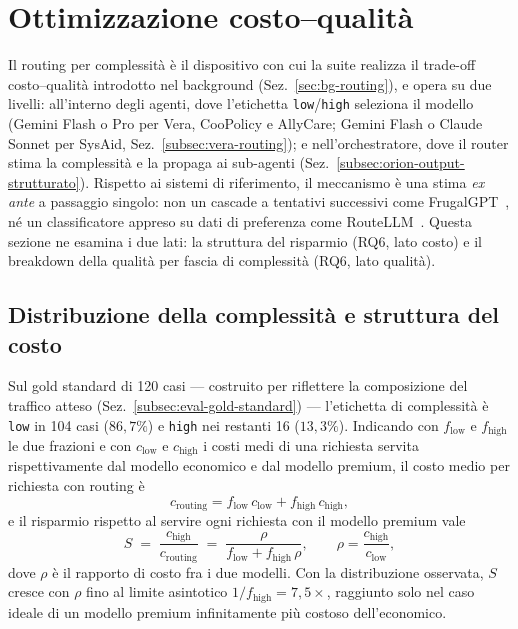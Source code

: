 \section{Ottimizzazione costo--qualità}
\label{sec:eval-costo-qualita}

Il routing per complessità è il dispositivo con cui la suite realizza il
trade-off costo--qualità introdotto nel background
(Sez.~\ref{sec:bg-routing}), e opera su due livelli: all'interno degli
agenti, dove l'etichetta \texttt{low}/\texttt{high} seleziona il modello
(Gemini Flash o Pro per Vera, CooPolicy e AllyCare; Gemini Flash o Claude
Sonnet per SysAid, Sez.~\ref{subsec:vera-routing}); e nell'orchestratore,
dove il router stima la complessità e la propaga ai sub-agenti
(Sez.~\ref{subsec:orion-output-strutturato}). Rispetto ai sistemi di
riferimento, il meccanismo è una stima \emph{ex ante} a passaggio singolo:
non un cascade a tentativi successivi come
FrugalGPT~\cite{chen2023frugalgpt}, né un classificatore appreso su dati di
preferenza come RouteLLM~\cite{ong2024routellm}. Questa sezione ne esamina
i due lati: la struttura del risparmio (RQ6, lato costo) e il breakdown
della qualità per fascia di complessità (RQ6, lato qualità).

\subsection{Distribuzione della complessità e struttura del costo}
\label{subsec:eval-cq-costo}

Sul gold standard di 120 casi --- costruito per riflettere la composizione
del traffico atteso (Sez.~\ref{subsec:eval-gold-standard}) --- l'etichetta
di complessità è \texttt{low} in 104 casi ($86{,}7\%$) e \texttt{high} nei
restanti 16 ($13{,}3\%$). Indicando con $f_{\mathrm{low}}$ e
$f_{\mathrm{high}}$ le due frazioni e con $c_{\mathrm{low}}$ e
$c_{\mathrm{high}}$ i costi medi di una richiesta servita rispettivamente
dal modello economico e dal modello premium, il costo medio per richiesta
con routing è
\[
  c_{\mathrm{routing}} = f_{\mathrm{low}} \, c_{\mathrm{low}} + f_{\mathrm{high}} \, c_{\mathrm{high}},
\]
e il risparmio rispetto al servire ogni richiesta con il modello premium
vale
\[
  S \;=\; \frac{c_{\mathrm{high}}}{c_{\mathrm{routing}}}
    \;=\; \frac{\rho}{f_{\mathrm{low}} + f_{\mathrm{high}}\,\rho},
  \qquad \rho = \frac{c_{\mathrm{high}}}{c_{\mathrm{low}}},
\]
dove $\rho$ è il rapporto di costo fra i due modelli. Con la distribuzione
osservata, $S$ cresce con $\rho$ fino al limite asintotico
$1/f_{\mathrm{high}} = 7{,}5\times$, raggiunto solo nel caso ideale di un
modello premium infinitamente più costoso dell'economico.

